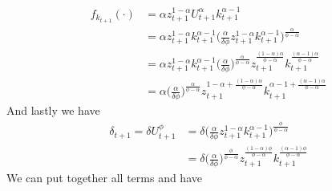 \documentclass[a4paper]{article}
\theoremstyle{definition}
\begin{document}
	\begin{align*}
	f_{k_{t+1}}(\cdot)	&= \alpha z_{t+1}^{1-\alpha}U_{t+1}^{\alpha}k_{t+1}^{\alpha-1} \\
							&= \alpha z_{t+1}^{1-\alpha} k_{t+1}^{\alpha-1} \Big( \frac{\alpha}{\delta\phi}z_{t+1}^{1-\alpha}k_{t+1}^{\alpha-1} \Big)^{\frac{\alpha}{\phi-\alpha}} \\
							&= \alpha z_{t+1}^{1-\alpha} k_{t+1}^{\alpha-1} \Big( \frac{\alpha}{\delta\phi} \Big)^{\frac{\alpha}{\phi-\alpha}}z_{t+1}^{\frac{(1-\alpha)\alpha}{\phi-\alpha}}k_{t+1}^{\frac{(\alpha-1)\alpha}{\phi-\alpha}}  \\
							&= \alpha \Big( \frac{\alpha}{\delta\phi} \Big)^{\frac{\alpha}{\phi-\alpha}} z_{t+1}^{1-\alpha+\frac{(1-\alpha)\alpha}{\phi-\alpha}}k_{t+1}^{\alpha-1+\frac{(\alpha-1)\alpha}{\phi-\alpha}}
	\end{align*}	
And lastly we have
	\begin{align*}
	\delta_{t+1}=\delta U_{t+1}^{\phi} 	&= \delta \Big( \frac{\alpha}{\delta\phi}z_{t+1}^{1-\alpha}k_{t+1}^{\alpha-1} \Big)^{\frac{\phi}{\phi-\alpha}} \\
												&= \delta \Big( \frac{\alpha}{\delta\phi} \Big)^{\frac{\phi}{\phi-\alpha}}z_{t+1}^{\frac{(1-\alpha)\phi}{\phi-\alpha}}k_{t+1}^{\frac{(\alpha-1)\phi}{\phi-\alpha}}
	\end{align*}
We can put together all terms and have
\end{document}
